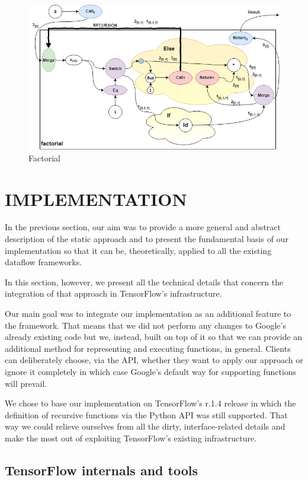 \documentclass[ack,preface]{dithesis}
\begin{document}
\begin{figure}[h]
\centering
\includegraphics[scale=0.63]{figures/factorial}
\caption{Factorial}
\end{figure}
\chapter{IMPLEMENTATION}
In the previous section, our aim was to provide a more general and abstract description of the static approach and to present the fundamental basis of our implementation so that it can be, theoretically, applied to all the existing dataflow frameworks. 

In this section, however, we present all the technical details that concern the integration of that approach in TensorFlow's infrastructure.

Our main goal was to integrate our implementation as an additional feature to the framework. That means that we did not perform any changes to Google's already existing code but we, instead, built on top of it so that we can provide an additional method for representing and executing functions, in general. Clients can deliberately choose, via the API, whether they want to apply our approach or ignore it completely in which case Google's default way for supporting functions will prevail.

We chose to base our implementation on TensorFlow's r.1.4 release in which the definition of recursive functions via the Python API was still supported. That way we could relieve ourselves from all the dirty, interface-related details and make the most out of exploiting TensorFlow's existing infrastructure.  

    \section{TensorFlow internals and tools}
\end{document}
